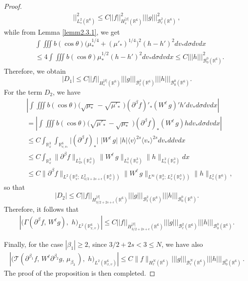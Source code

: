 \documentclass{amsart}[12pt, article]
\begin{document}
\begin{proof}
\begin{align*}
||^2_{L^2_s({{{\mathbb R}}}^6)}\leq C ||f||^2_{H^{|\beta|}_s({{{\mathbb R}}}^6)} ||| g
|||^2_{{{\mathcal B}}^2_\ell({{{\mathbb R}}}^6)}\, ,
\end{align*}
while {}from Lemma \ref{lemm2.3.1}, we get
\begin{align*}
& \int\iiint b(\cos\theta) \Big( \mu^{1/4}_\ast + (\mu'_*)^{1/4}
\Big)^2 (h-h')^2 d v_* d \sigma dvdx\\
&\leq 4 \int\iiint b(\cos\theta)  \mu^{1/2}_\ast (h-h')^2 d v_* d
\sigma dvdx\leq C|||h|||^2_{{{\mathcal B}}^0_0({{{\mathbb R}}}^6)}.
\end{align*}
Therefore, we obtain
$$
|D_1|\leq C ||f||_{H^{|\beta|}_s({{{\mathbb R}}}^6)} ||| g
|||_{{{\mathcal B}}^2_\ell({{{\mathbb R}}}^6)}|||h|||_{{{\mathcal B}}^0_0({{{\mathbb R}}}^6)}.
$$
For the term $D_2$, we have
\begin{align*}
&\left|\int\iiint b(\cos\theta) \Big(\sqrt{\mu_*}\,
-\sqrt{\mu'_*}\,\,\Big)(\partial^{\beta} f)'_* (W^\ell\,g)' h' d v_*
d \sigma dvdx\right|\\
&=\left|\int\iiint b(\cos\theta) \Big(\sqrt{\mu'_*}\,
-\sqrt{\mu_*}\,\,\Big)(\partial^{\beta} f)_* (W^\ell\,g) h d v_* d
\sigma dvdx\right|\\
&\leq C \int_{{{{\mathbb R}}}^3_x}\int_{{{{\mathbb R}}}^6_{v, v_*}}\Big|(\partial^{\beta}
f)_*\Big|\,\, \Big|W^\ell\,g\Big|\,\, |h| \langle
v\rangle^{2s}\langle v_*\rangle^{2s} d v_* d  dvdx\\
&\leq C \int_{{{{\mathbb R}}}^3_x}\|\partial^{\beta} f\|_{L^1_{2s}({{{\mathbb R}}}^3_v)}
\|W^\ell\,g\|_{L^2_{s}({{{\mathbb R}}}^3_v)} \|h\|_{L^2_{s}({{{\mathbb R}}}^3_v)} dx\\
&\leq C \|\partial^{\beta} f\|_{L^2({{{\mathbb R}}}^3_x;\,
L^2_{3/2+2s+\epsilon}({{{\mathbb R}}}^3_v))} \|W^\ell\,g\|_{L^\infty({{{\mathbb R}}}^3_x;\,
L^2_{s}({{{\mathbb R}}}^3_v))} \|h\|_{L^2_{s}({{{\mathbb R}}}^6)},
\end{align*}
so that
$$
|D_2|\leq C ||f||_{H^{|\beta|}_{3/2+2s+\epsilon}({{{\mathbb R}}}^6)} ||| g
|||_{{{\mathcal B}}^2_\ell({{{\mathbb R}}}^6)}|||h|||_{{{\mathcal B}}^0_0({{{\mathbb R}}}^6)}.
$$
Therefore, it follows that
\begin{align}\label{3.2.6+4}
\left|\Big(\Gamma(\partial^{\beta} f,\,
 W^\ell g) ,\,\, h\Big)_{L^2({{{\mathbb R}}}^6_{x, v})}\right|\leq C
 ||f||_{H^{|\beta|}_{3/2+2s+\epsilon}({{{\mathbb R}}}^6)} ||| g
|||_{{{\mathcal B}}^2_\ell({{{\mathbb R}}}^6)}|||h|||_{{{\mathcal B}}^0_0({{{\mathbb R}}}^6)}.
\end{align}

Finally, for the case $|\beta_1|\geq 2$, since $3/2+2s<3\leq N$, we have
also
\begin{align*}\label{3.2.6+3}
\left|\Big({{\mathcal T}}(\partial^{\beta_1} f,\, W^\ell\partial^{\beta_2} g,\,
\mu_{\beta_3}\,) ,\,\, h\Big)_{L^2({{{\mathbb R}}}^6_{x, v})}\right|
 \leq C \| f\|_{H^{N}_\ell({{{\mathbb R}}}^6)}
|||g|||_{{{\mathcal B}}^{N}_\ell({{{\mathbb R}}}^6)} |||h|||_{{{\mathcal B}}^0_0({{{\mathbb R}}}^6)}\,.
\end{align*}
The proof of the proposition is then completed.
\end{proof}
\end{document}
